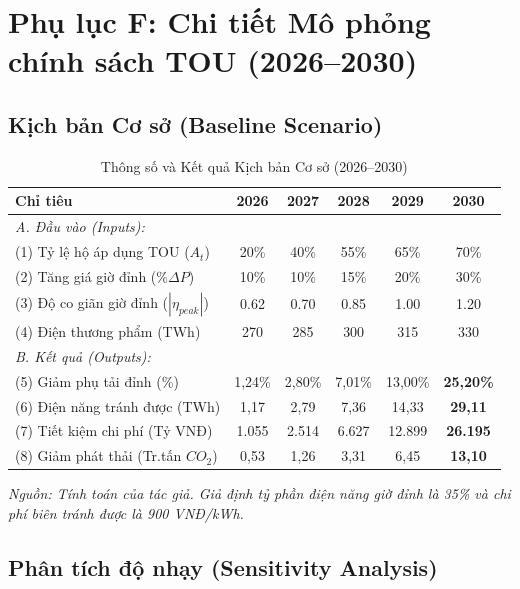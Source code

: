 \documentclass[12pt,a4paper,oneside]{article}
\begin{document}
\section{Phụ lục F: Chi tiết Mô phỏng chính sách TOU (2026--2030)}

\subsection{Kịch bản Cơ sở (Baseline Scenario)}

\begin{table}[H]
	\centering
	\caption{Thông số và Kết quả Kịch bản Cơ sở (2026--2030)}
	\label{tab:sim_baseline}
	\begin{tabular}{lccccc}
		\toprule
		\textbf{Chỉ tiêu} & \textbf{2026} & \textbf{2027} & \textbf{2028} & \textbf{2029} & \textbf{2030} \\
		\midrule
		\textit{A. Đầu vào (Inputs):} & & & & & \\
		(1) Tỷ lệ hộ áp dụng TOU ($A_t$) & 20\% & 40\% & 55\% & 65\% & 70\% \\
		(2) Tăng giá giờ đỉnh ($\% \Delta P$) & 10\% & 10\% & 15\% & 20\% & 30\% \\
		(3) Độ co giãn giờ đỉnh ($|\eta_{peak}|$) & 0.62 & 0.70 & 0.85 & 1.00 & 1.20 \\
		(4) Điện thương phẩm (TWh) & 270 & 285 & 300 & 315 & 330 \\
		\midrule
		\textit{B. Kết quả (Outputs):} & & & & & \\
		(5) Giảm phụ tải đỉnh (\%) & 1,24\% & 2,80\% & 7,01\% & 13,00\% & \textbf{25,20\%} \\
		(6) Điện năng tránh được (TWh) & 1,17 & 2,79 & 7,36 & 14,33 & \textbf{29,11} \\
		(7) Tiết kiệm chi phí (Tỷ VNĐ) & 1.055 & 2.514 & 6.627 & 12.899 & \textbf{26.195} \\
		(8) Giảm phát thải (Tr.tấn $CO_2$) & 0,53 & 1,26 & 3,31 & 6,45 & \textbf{13,10} \\
		\bottomrule
	\end{tabular}
	\footnotesize{\textit{Nguồn: Tính toán của tác giả. Giả định tỷ phần điện năng giờ đỉnh là 35\% và chi phí biên tránh được là 900 VNĐ/kWh.}}
\end{table}

\subsection{Phân tích độ nhạy (Sensitivity Analysis)}
\end{document}
